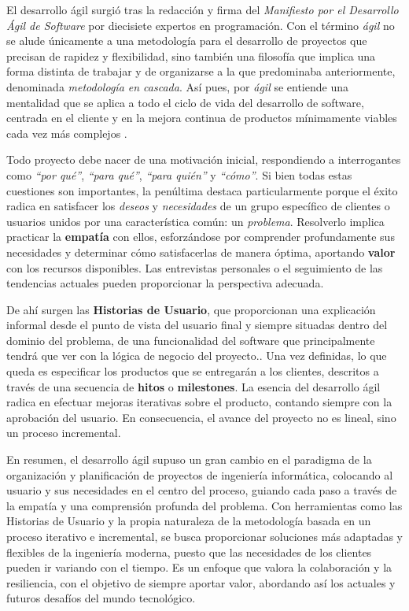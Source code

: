 El desarrollo ágil surgió tras la redacción y firma del \textit{Manifiesto por el Desarrollo Ágil de Software} \cite{agile-manifest} por diecisiete expertos en programación. Con el término \textit{ágil} no se alude únicamente a una metodología para el desarrollo de proyectos que precisan de rapidez y flexibilidad, sino también una filosofía que implica una forma distinta de trabajar y de organizarse a la que predominaba anteriormente, denominada \textit{metodología en cascada}. Así pues, por \textit{ágil} se entiende una mentalidad que se aplica a todo el ciclo de vida del desarrollo de software, centrada en el cliente y en la mejora continua de productos mínimamente viables cada vez más complejos \cite{jj-agile-manifesto}.

Todo proyecto debe nacer de una motivación inicial, respondiendo a interrogantes como \textit{``por qué''}, \textit{``para qué''}, \textit{``para quién''} y \textit{``cómo''}. Si bien todas estas cuestiones son importantes, la penúltima destaca particularmente porque el éxito radica en satisfacer los \textit{deseos} y \textit{necesidades} de un grupo específico de clientes o usuarios unidos por una característica común: un \textit{problema}. 
Resolverlo implica practicar la \textbf{empatía} con ellos, esforzándose por comprender profundamente sus necesidades y determinar cómo satisfacerlas de manera óptima, aportando \textbf{valor} con los recursos disponibles. Las entrevistas personales o el seguimiento de las tendencias actuales pueden proporcionar la perspectiva adecuada.

De ahí surgen las \textbf{Historias de Usuario}, que proporcionan una explicación informal desde el punto de vista del usuario final y siempre situadas dentro del dominio del problema, de una funcionalidad del software que principalmente tendrá que ver con la lógica de negocio del proyecto.\cite{jj-design-thinking}. Una vez definidas, lo que queda es especificar los productos que se entregarán a los clientes, descritos a través de una secuencia de \textbf{hitos} o \textbf{milestones}. La esencia del desarrollo ágil radica en efectuar mejoras iterativas sobre el producto, contando siempre con la aprobación del usuario. En consecuencia, el avance del proyecto no es lineal, sino un proceso incremental.

En resumen, el desarrollo ágil supuso un gran cambio en el paradigma de la organización y planificación de proyectos de ingeniería informática, colocando al usuario y sus necesidades en el centro del proceso, guiando cada paso a través de la empatía y una comprensión profunda del problema. Con herramientas como las Historias de Usuario y la propia naturaleza de la metodología basada en un proceso iterativo e incremental, se busca proporcionar soluciones más adaptadas y flexibles de la ingeniería moderna, puesto que las necesidades de los clientes pueden ir variando con el tiempo. Es un enfoque que valora la colaboración y la resiliencia, con el objetivo de siempre aportar valor, abordando así los actuales y futuros desafíos del mundo tecnológico.

